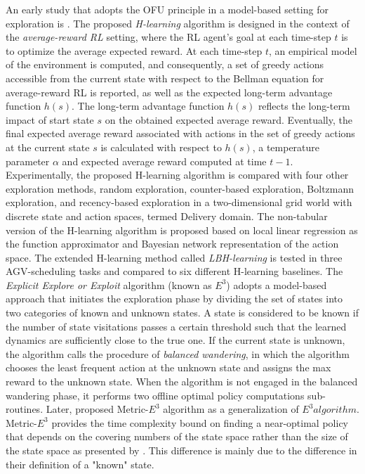 An early study that adopts the OFU principle in a model-based setting for exploration is . The proposed \textit{H-learning} algorithm is designed in the context of the \textit{average-reward RL} setting, where the RL agent's goal at each time-step $t$ is to optimize the average expected reward. At each time-step $t$, an empirical model of the environment is computed, and consequently, a set of greedy actions accessible from the current state with respect to the Bellman equation for average-reward RL is reported, as well as the expected long-term advantage function $h(s)$. The long-term advantage function $h(s)$ reflects the long-term impact of start state $s$ on the obtained expected average reward. Eventually, the final expected average reward associated with actions in the set of greedy actions at the current state $s$ is calculated with respect to $h(s)$, a temperature parameter $\alpha$ and expected average reward computed at time $t-1$. Experimentally, the proposed H-learning algorithm is compared with four other exploration methods, random exploration, counter-based exploration, Boltzmann exploration, and recency-based exploration in a two-dimensional grid world with discrete state and action spaces, termed Delivery domain. The non-tabular version of the H-learning algorithm is proposed based on local linear regression as the function approximator and Bayesian network representation of the action space. The extended H-learning method called \textit{LBH-learning} is tested in three AGV-scheduling tasks  and compared to six different H-learning baselines.
The \textit{Explicit Explore or Exploit} algorithm (known as $E^3$)  adopts a model-based approach that initiates the exploration phase by dividing the set of states into two categories of known and unknown states. A state is considered to be known if the number of state visitations passes a certain threshold such that the learned dynamics are sufficiently close to the true one. If the current state is unknown, the algorithm calls the procedure of \textit{balanced wandering}, in which the algorithm chooses the least frequent action at the unknown state and assigns the max reward to the unknown state. When the algorithm is not engaged in the balanced wandering phase, it performs two offline optimal policy computations sub-routines. Later,  proposed Metric-$E^3$ algorithm as a generalization of $E^3 algorithm$. Metric-$E^3$ provides the time complexity bound on finding a near-optimal policy that depends on the covering numbers of the state space rather than the size of the state space as presented by . This difference is mainly due to the difference in their definition of a "known" state.  
